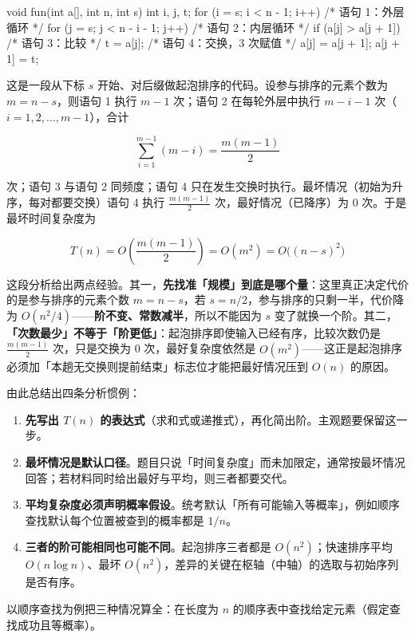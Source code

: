 \documentclass[11pt,openany,UTF8]{ctexbook}
\begin{document}
\begin{codebox}
void fun(int a[], int n, int s) {
    int i, j, t;
    for (i = s; i < n - 1; i++) {         /* 语句 1：外层循环 */
        for (j = s; j < n - i - 1; j++) { /* 语句 2：内层循环 */
            if (a[j] > a[j + 1]) {        /* 语句 3：比较 */
                t = a[j];                 /* 语句 4：交换，3 次赋值 */
                a[j] = a[j + 1];
                a[j + 1] = t;
            }
        }
    }
}
\end{codebox}

这是一段从下标 $s$ 开始、对后缀做起泡排序的代码。设参与排序的元素个数为 $m = n-s$，则语句 1 执行 $m-1$ 次；语句 2 在每轮外层中执行 $m-i-1$ 次（$i=1,2,\dots,m-1$），合计

\[\sum_{i=1}^{m-1}(m-i)=\frac{m(m-1)}{2}\]

次；语句 3 与语句 2 同频度；语句 4 只在发生交换时执行。最坏情况（初始为升序，每对都要交换）语句 4 执行 $\frac{m(m-1)}{2}$ 次，最好情况（已降序）为 0 次。于是最坏时间复杂度为

\[T(n)=O\!\left(\frac{m(m-1)}{2}\right)=O(m^2)=O\big((n-s)^2\big)\]

这段分析给出两点经验。其一，\textbf{先找准「规模」到底是哪个量}：这里真正决定代价的是参与排序的元素个数 $m=n-s$，若 $s=n/2$，参与排序的只剩一半，代价降为 $O(n^2/4)$——\textbf{阶不变、常数减半}，所以不能因为 $s$ 变了就换一个阶。其二，\textbf{「次数最少」不等于「阶更低」}：起泡排序即使输入已经有序，比较次数仍是 $\frac{m(m-1)}{2}$ 次，只是交换为 0 次，最好复杂度依然是 $O(m^2)$——这正是起泡排序必须加「本趟无交换则提前结束」标志位才能把最好情况压到 $O(n)$ 的原因。

由此总结出四条分析惯例：

\begin{enumerate}
\item \textbf{先写出 $T(n)$ 的表达式}（求和式或递推式），再化简出阶。主观题要保留这一步。
\item \textbf{最坏情况是默认口径}。题目只说「时间复杂度」而未加限定，通常按最坏情况回答；若材料同时给出最好与平均，则三者都要交代。
\item \textbf{平均复杂度必须声明概率假设}。统考默认「所有可能输入等概率」，例如顺序查找默认每个位置被查到的概率都是 $1/n$。
\item \textbf{三者的阶可能相同也可能不同}。起泡排序三者都是 $O(n^2)$；快速排序平均 $O(n\log n)$、最坏 $O(n^2)$，差异的关键在枢轴（中轴）的选取与初始序列是否有序。
\end{enumerate}
以顺序查找为例把三种情况算全：在长度为 $n$ 的顺序表中查找给定元素（假定查找成功且等概率）。
\end{document}
